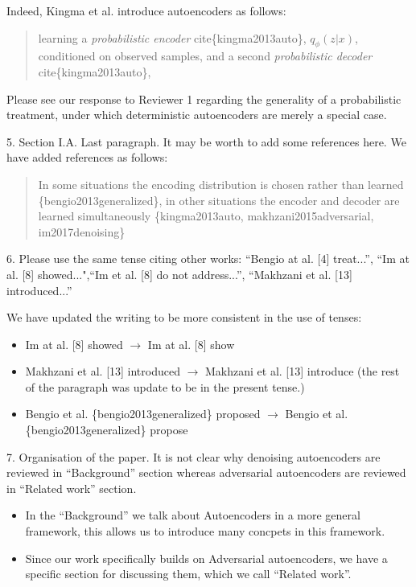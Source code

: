 \documentclass{article}
\begin{document}
Indeed, Kingma et al. introduce autoencoders as follows:
    \begin{quote}
        learning a \textit{probabilistic encoder} cite\{kingma2013auto\}, $q_\phi(z|x)$, conditioned on observed samples, and a second \textit{probabilistic decoder} cite\{kingma2013auto\},
    \end{quote} 
Please see our response to Reviewer 1 regarding the generality of a probabilistic treatment, under which deterministic autoencoders are merely a special case.

{\color{blue}
5. Section I.A. Last paragraph. It may be worth to add some references here.} \newline
We have added references as follows:
\begin{quote}
    In some situations the encoding distribution is chosen rather than learned \{bengio2013generalized\}, in other situations the encoder and decoder are learned simultaneously \{kingma2013auto, makhzani2015adversarial, im2017denoising\}
\end{quote}

{\color{blue}
6. Please use the same tense citing other works: ``Bengio at al. [4] treat...'', ``Im at al. [8] showed...",``Im et al. [8] do not address...'', ``Makhzani et al. [13] introduced...''}\\


{\color{red}
We have updated the writing to be more consistent in the use of tenses:
\begin{itemize}
    \item Im at al. [8] showed $\rightarrow$ Im at al. [8] show
    \item Makhzani et al. [13] introduced $\rightarrow$ Makhzani et al. [13] introduce (the rest of the paragraph was update to be in the present tense.)
    \item Bengio et al. \{bengio2013generalized\} proposed $\rightarrow$ Bengio et al. \{bengio2013generalized\} propose
\end{itemize}
}


{\color{blue}
7. Organisation of the paper. It is not clear why denoising autoencoders are reviewed in ``Background'' section whereas adversarial autoencoders are reviewed in ``Related work'' section.}\\

\begin{itemize}
    \item In the ``Background'' we talk about Autoencoders in a more general framework, this allows us to introduce many concpets in this framework.
    \item Since our work specifically builds on Adversarial autoencoders, we have a specific section for discussing them, which we call ``Related work''. 
\end{itemize}
\end{document}
